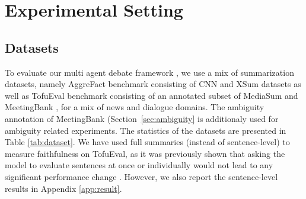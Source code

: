\section{Experimental Setting}


\subsection{Datasets}
To evaluate our multi agent debate framework \method, we use a mix of summarization datasets, namely AggreFact \cite{tang-etal-2023-understanding} benchmark consisting of CNN and XSum datasets %
as well as TofuEval benchmark \cite{tang2024tofueval} consisting of an annotated subset of MediaSum \cite{zhu2021mediasum} and MeetingBank \cite{hu2023meetingbank}, for a mix of news and dialogue domains. The ambiguity annotation of MeetingBank (Section~\ref{sec:ambiguity} is additionaly used for ambiguity related experiments. 
The statistics of the datasets are presented in Table \ref{tab:dataset}.
We have used full summaries (instead of sentence-level) to measure faithfulness on TofuEval, as it was previously shown that asking the model to evaluate sentences at once or individually would not lead to any significant performance change \cite{tang2024minicheck}. However, we also report the sentence-level results in Appendix \ref{app:result}.

